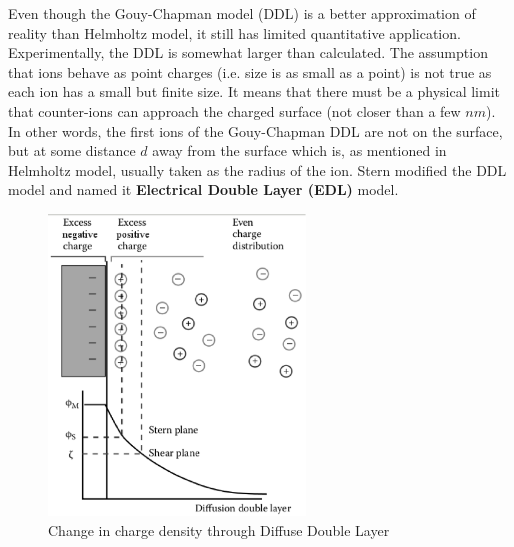 Even though the Gouy-Chapman model (DDL) is a better approximation of
reality than Helmholtz model, it still has limited quantitative
application.  Experimentally, the DDL is somewhat larger than
calculated. The assumption that ions behave as point charges
(i.e. size is as small as a point) is not true as each ion has a small
but finite size. It means that there must be a physical limit that
counter-ions can approach the charged surface (not closer than a few
$nm$). In other words, the first ions of the Gouy-Chapman DDL are not
on the surface, but at some distance $d$ away from the surface which
is, as mentioned in Helmholtz model, usually taken as the radius of
the ion.  Stern modified the DDL model and named it
{\bf Electrical Double Layer (EDL)} model.

\begin{figure}[htb]
  \centerline{\includegraphics[height=8cm]{./images/Stern-DDL.eps}}
  \caption{Change in charge density through Diffuse Double Layer}\label{fig:Stern-DL}
\end{figure}






